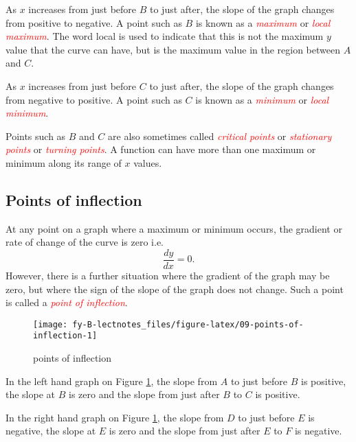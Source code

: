 \documentclass[
  11pt,
  oneside]{book}
\newcommand{\slide}{}
\theoremstyle{definition}
\theoremstyle{definition}
\theoremstyle{definition}
\theoremstyle{definition}
\theoremstyle{remark}
\begin{document}
As \(x\) increases from just before \(B\) to just after, the slope of the graph changes from positive to negative. A point such as \(B\) is known as a \textcolor{red}{\em maximum} or \textcolor{red}{\em local maximum}. The word local is used to indicate that this is not the maximum \(y\) value that the curve can have, but is the maximum value in the region between \(A\) and \(C\).

As \(x\) increases from just before \(C\) to just after, the slope of the graph changes from negative to positive. A point such as \(C\) is known as a \textcolor{red}{\em minimum} or \textcolor{red}{\em local minimum}.

Points such as \(B\) and \(C\) are also sometimes called \textcolor{red}{\em critical points} or \textcolor{red}{\em stationary points} or \textcolor{red}{\em turning points}. A function can have more than one maximum or minimum along its range of \(x\) values.
\slide

\subsection{Points of inflection}\label{points-of-inflection}

At any point on a graph where a maximum or minimum occurs, the gradient or rate of change of the curve is zero i.e.
\[
\frac{dy}{dx}=0.
\]
However, there is a further situation where the gradient of the graph may be zero, but where the sign of the slope of the graph does not change. Such a point is called a \textcolor{red}{\em point of inflection}.

\begin{figure}

{\centering \texttt{[image: fy-B-lectnotes\_files/figure-latex/09-points-of-inflection-1]} 

}

\caption{points of inflection}\label{fig:09-points-of-inflection}
\end{figure}

In the left hand graph on Figure \ref{fig:09-points-of-inflection}, the slope from \(A\) to just before \(B\) is positive, the slope at \(B\) is zero and the slope from just after \(B\) to \(C\) is positive.

In the right hand graph on Figure \ref{fig:09-points-of-inflection}, the slope from \(D\) to just before \(E\) is negative, the slope at \(E\) is zero and the slope from just after \(E\) to \(F\) is negative.
\end{document}
